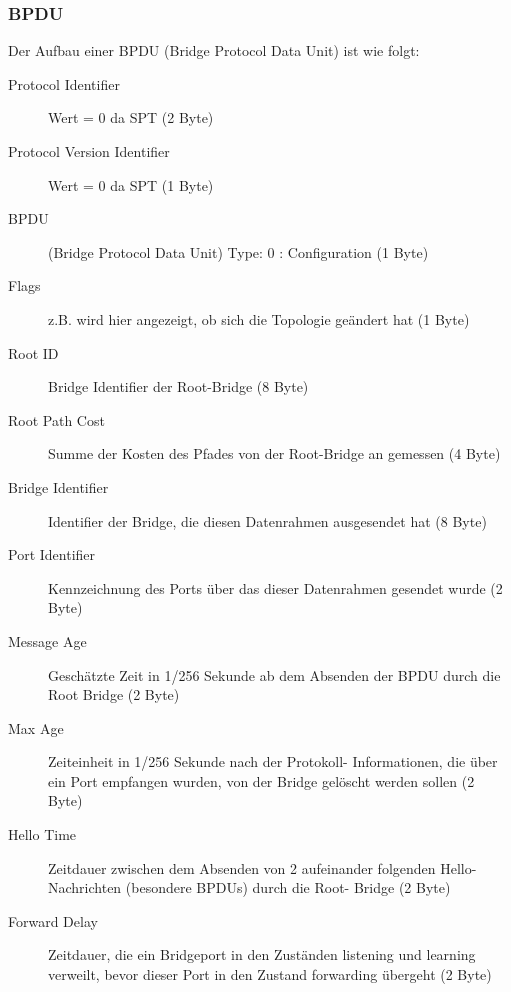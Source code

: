\documentclass[a4paper,10pt]{scrartcl}
\begin{document}
            \subsubsection*{BPDU}
            Der Aufbau einer BPDU (Bridge Protocol Data Unit) ist wie folgt: 
            \begin{description}
                \item[Protocol Identifier] Wert = 0 da SPT (2 Byte)
                \item[Protocol Version Identifier] Wert = 0 da SPT (1 Byte)
                \item[BPDU] (Bridge Protocol Data Unit) Type: 0 : Configuration (1 Byte)
                \item[Flags] z.B. wird hier angezeigt, ob sich die Topologie geändert hat (1 Byte)
                \item[Root ID] Bridge Identifier der Root-Bridge (8 Byte)
                \item[Root Path Cost] Summe der Kosten des Pfades von der Root-Bridge an gemessen (4 Byte)
                \item[Bridge Identifier] Identifier der Bridge, die diesen Datenrahmen ausgesendet hat (8 Byte)
                \item[Port Identifier] Kennzeichnung des Ports über das dieser Datenrahmen gesendet wurde (2 Byte)
                \item[Message Age] Geschätzte Zeit in 1/256 Sekunde ab dem Absenden der BPDU durch die Root Bridge (2 Byte)
                \item[Max Age] Zeiteinheit in 1/256 Sekunde nach der Protokoll- Informationen, die über ein Port empfangen wurden, von der Bridge gelöscht werden sollen (2 Byte)
                \item[Hello Time] Zeitdauer zwischen dem Absenden von 2 aufeinander folgenden Hello- Nachrichten (besondere BPDUs) durch die Root- Bridge (2 Byte)
                \item[Forward Delay] Zeitdauer, die ein Bridgeport in den Zuständen listening und learning verweilt, bevor dieser Port in den Zustand forwarding übergeht (2 Byte)
            \end{description}
            
\end{document}
